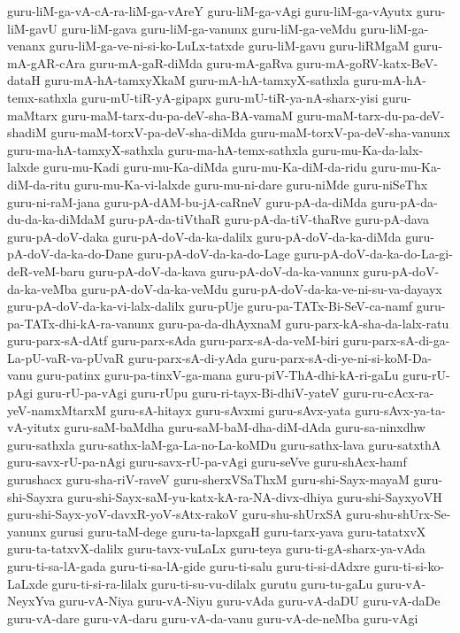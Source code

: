 {guru-liM-ga-vA-cA-ra-liM-ga-vAreY
guru-liM-ga-vAgi
guru-liM-ga-vAyutx
guru-liM-gavU
guru-liM-gava
guru-liM-ga-vanunx
guru-liM-ga-veMdu
guru-liM-ga-venanx
guru-liM-ga-ve-ni-si-ko-LuLx-tatxde
guru-liM-gavu
guru-liRMgaM
guru-mA-gAR-cAra
guru-mA-gaR-diMda
guru-mA-gaRva
guru-mA-goRV-katx-BeV-dataH
guru-mA-hA-tamxyXkaM
guru-mA-hA-tamxyX-sathxla
guru-mA-hA-temx-sathxla
guru-mU-tiR-yA-gipapx
guru-mU-tiR-ya-nA-sharx-yisi
guru-maMtarx
guru-maM-tarx-du-pa-deV-sha-BA-vamaM
guru-maM-tarx-du-pa-deV-shadiM
guru-maM-torxV-pa-deV-sha-diMda
guru-maM-torxV-pa-deV-sha-vanunx
guru-ma-hA-tamxyX-sathxla
guru-ma-hA-temx-sathxla
guru-mu-Ka-da-lalx-lalxde
guru-mu-Kadi
guru-mu-Ka-diMda
guru-mu-Ka-diM-da-ridu
guru-mu-Ka-diM-da-ritu
guru-mu-Ka-vi-lalxde
guru-mu-ni-dare
guru-niMde
guru-niSeThx
guru-ni-raM-jana
guru-pA-dAM-bu-jA-caRneV
guru-pA-da-diMda
guru-pA-da-du-da-ka-diMdaM
guru-pA-da-tiVthaR
guru-pA-da-tiV-thaRve
guru-pA-dava
guru-pA-doV-daka
guru-pA-doV-da-ka-dalilx
guru-pA-doV-da-ka-diMda
guru-pA-doV-da-ka-do-Dane
guru-pA-doV-da-ka-do-Lage
guru-pA-doV-da-ka-do-La-gi-deR-veM-baru
guru-pA-doV-da-kava
guru-pA-doV-da-ka-vanunx
guru-pA-doV-da-ka-veMba
guru-pA-doV-da-ka-veMdu
guru-pA-doV-da-ka-ve-ni-su-va-dayayx
guru-pA-doV-da-ka-vi-lalx-dalilx
guru-pUje
guru-pa-TATx-Bi-SeV-ca-namf
guru-pa-TATx-dhi-kA-ra-vanunx
guru-pa-da-dhAyxnaM
guru-parx-kA-sha-da-lalx-ratu
guru-parx-sA-dAtf
guru-parx-sAda
guru-parx-sA-da-veM-biri
guru-parx-sA-di-ga-La-pU-vaR-va-pUvaR
guru-parx-sA-di-yAda
guru-parx-sA-di-ye-ni-si-koM-Da-vanu
guru-patinx
guru-pa-tinxV-ga-mana
guru-piV-ThA-dhi-kA-ri-gaLu
guru-rU-pAgi
guru-rU-pa-vAgi
guru-rUpu
guru-ri-tayx-Bi-dhiV-yateV
guru-ru-cAcx-ra-yeV-namxMtarxM
guru-sA-hitayx
guru-sAvxmi
guru-sAvx-yata
guru-sAvx-ya-ta-vA-yitutx
guru-saM-baMdha
guru-saM-baM-dha-diM-dAda
guru-sa-ninxdhw
guru-sathxla
guru-sathx-laM-ga-La-no-La-koMDu
guru-sathx-lava
guru-satxthA
guru-savx-rU-pa-nAgi
guru-savx-rU-pa-vAgi
guru-seVve
guru-shAcx-hamf
gurushacx
guru-sha-riV-raveV
guru-sherxVSaThxM
guru-shi-Sayx-mayaM
guru-shi-Sayxra
guru-shi-Sayx-saM-yu-katx-kA-ra-NA-divx-dhiya
guru-shi-SayxyoVH
guru-shi-Sayx-yoV-davxR-yoV-sAtx-rakoV
guru-shu-shUrxSA
guru-shu-shUrx-Se-yanunx
gurusi
guru-taM-dege
guru-ta-lapxgaH
guru-tarx-yava
guru-tatatxvX
guru-ta-tatxvX-dalilx
guru-tavx-vuLaLx
guru-teya
guru-ti-gA-sharx-ya-vAda
guru-ti-sa-lA-gada
guru-ti-sa-lA-gide
guru-ti-salu
guru-ti-si-dAdxre
guru-ti-si-ko-LaLxde
guru-ti-si-ra-lilalx
guru-ti-su-vu-dilalx
gurutu
guru-tu-gaLu
guru-vA-NeyxYva
guru-vA-Niya
guru-vA-Niyu
guru-vAda
guru-vA-daDU
guru-vA-daDe
guru-vA-dare
guru-vA-daru
guru-vA-da-vanu
guru-vA-de-neMba
guru-vAgi
}
